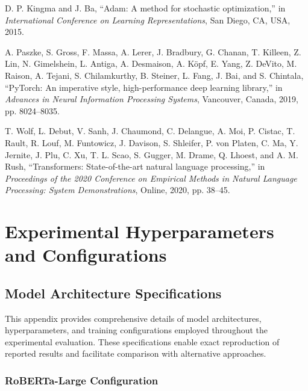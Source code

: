 \documentclass[12pt,a4paper]{report}
\begin{document}
\begin{thebibliography}{99}
D. P. Kingma and J. Ba, ``Adam: A method for stochastic optimization,'' in \textit{International Conference on Learning Representations}, San Diego, CA, USA, 2015.

A. Paszke, S. Gross, F. Massa, A. Lerer, J. Bradbury, G. Chanan, T. Killeen, Z. Lin, N. Gimelshein, L. Antiga, A. Desmaison, A. Köpf, E. Yang, Z. DeVito, M. Raison, A. Tejani, S. Chilamkurthy, B. Steiner, L. Fang, J. Bai, and S. Chintala, ``PyTorch: An imperative style, high-performance deep learning library,'' in \textit{Advances in Neural Information Processing Systems}, Vancouver, Canada, 2019, pp. 8024--8035.

T. Wolf, L. Debut, V. Sanh, J. Chaumond, C. Delangue, A. Moi, P. Cistac, T. Rault, R. Louf, M. Funtowicz, J. Davison, S. Shleifer, P. von Platen, C. Ma, Y. Jernite, J. Plu, C. Xu, T. L. Scao, S. Gugger, M. Drame, Q. Lhoest, and A. M. Rush, ``Transformers: State-of-the-art natural language processing,'' in \textit{Proceedings of the 2020 Conference on Empirical Methods in Natural Language Processing: System Demonstrations}, Online, 2020, pp. 38--45.

\end{thebibliography}

\appendix

\chapter{Experimental Hyperparameters and Configurations}

\section{Model Architecture Specifications}

This appendix provides comprehensive details of model architectures, hyperparameters, and training configurations employed throughout the experimental evaluation. These specifications enable exact reproduction of reported results and facilitate comparison with alternative approaches.

\subsection{RoBERTa-Large Configuration}
\end{document}
